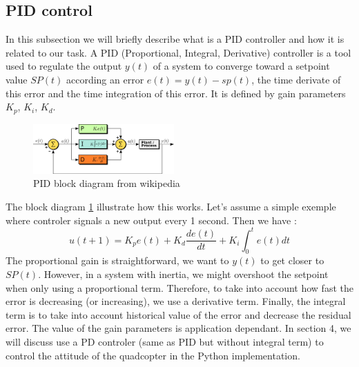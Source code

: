 \subsection{PID control \cite{johnson2005pid}}
In this subsection we will briefly describe what is a PID controller and how it is related to our task.
A PID (Proportional, Integral, Derivative) controller is a tool used to regulate the output $y(t)$ of a system to converge toward a setpoint value $SP(t)$ according an error $e(t)=y(t)-sp(t)$, the time derivate of this error and the time integration of this error. 
It is defined by gain parameters $K_p$, $K_i$, $K_d$. 
\begin{figure}[h!]
    \centering
    \includegraphics[width=0.48\textwidth]{Images/PID_en.svg.png}
    \caption{PID block diagram from wikipedia}
    \label{fig:blockpid}
\end{figure}
The block diagram \ref{fig:blockpid} illustrate how this works. Let's assume a simple exemple where controler signals a new output every 1 second. 
Then we have : 
\begin{equation}
    u(t+1) = K_p e(t) + K_d \frac{de(t)}{dt} + K_i\int_0^te(t)dt
    \label{eqn:pid}
\end{equation}
The proportional gain is straightforward, we want to $y(t)$ to get closer to $SP(t)$.
However, in a system with inertia, we might overshoot the setpoint when only using a proportional term. Therefore, to take into account how fast the error is decreasing (or increasing), we use a derivative term.
Finally, the integral term is to take into account historical value of the error and decrease the residual error.
The value of the gain parameters is application dependant.
In section 4, we will discuss use a PD controler (same as PID but without integral term) to control the attitude of the quadcopter in the Python implementation.
